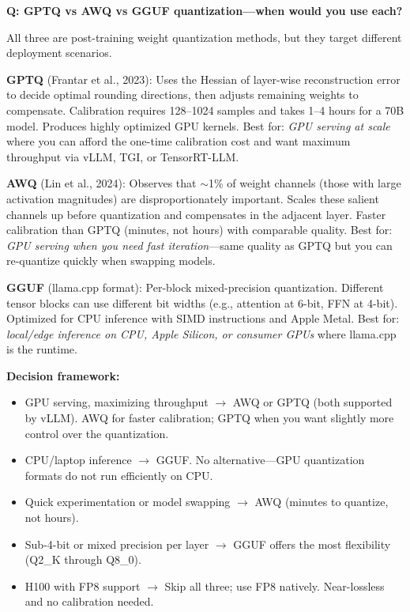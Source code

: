 \begin{interviewq}
\textbf{Q: GPTQ vs AWQ vs GGUF quantization---when would you use each?}

 \quad {} \quad \badgefreq{\freqmed}

\stronganswer

All three are post-training weight quantization methods, but they target different deployment scenarios.

\textbf{GPTQ} (Frantar et al., 2023): Uses the Hessian of layer-wise reconstruction error to decide optimal rounding directions, then adjusts remaining weights to compensate. Calibration requires 128--1024 samples and takes 1--4 hours for a 70B model. Produces highly optimized GPU kernels. Best for: \textit{GPU serving at scale} where you can afford the one-time calibration cost and want maximum throughput via vLLM, TGI, or TensorRT-LLM.

\textbf{AWQ} (Lin et al., 2024): Observes that $\sim$1\% of weight channels (those with large activation magnitudes) are disproportionately important. Scales these salient channels up before quantization and compensates in the adjacent layer. Faster calibration than GPTQ (minutes, not hours) with comparable quality. Best for: \textit{GPU serving when you need fast iteration}---same quality as GPTQ but you can re-quantize quickly when swapping models.

\textbf{GGUF} (llama.cpp format): Per-block mixed-precision quantization. Different tensor blocks can use different bit widths (e.g., attention at 6-bit, FFN at 4-bit). Optimized for CPU inference with SIMD instructions and Apple Metal. Best for: \textit{local/edge inference on CPU, Apple Silicon, or consumer GPUs} where llama.cpp is the runtime.

\textbf{Decision framework:}
\begin{itemize}
    \item GPU serving, maximizing throughput $\rightarrow$ AWQ or GPTQ (both supported by vLLM). AWQ for faster calibration; GPTQ when you want slightly more control over the quantization.
    \item CPU/laptop inference $\rightarrow$ GGUF. No alternative---GPU quantization formats do not run efficiently on CPU.
    \item Quick experimentation or model swapping $\rightarrow$ AWQ (minutes to quantize, not hours).
    \item Sub-4-bit or mixed precision per layer $\rightarrow$ GGUF offers the most flexibility (Q2\_K through Q8\_0).
    \item H100 with FP8 support $\rightarrow$ Skip all three; use FP8 natively. Near-lossless and no calibration needed.
\end{itemize}


\end{interviewq}

